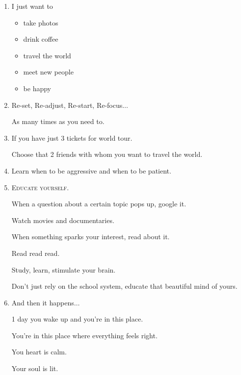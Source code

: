 \documentclass{article}
\numberwithin{equation}{section}
\begin{document}
\begin{enumerate}
    \textit{These moments will change you}.
    
    \textit{Let them make you \textsc{stronger, smarter}, and \textsc{kinder}.}
    
    \textit{But don't you go and become someone that you're not}.
    
    \textit{Cry}.
    
    \textit{Scream if you have to}.
    
    \textit{Then you straighten out that crown and keep moving}.'' - Erin van Vuren
    \item I just want to
    \begin{itemize}
        \item take photos
        \item drink coffee
        \item travel the world
        \item meet new people
        \item be happy
    \end{itemize}
    \item Re-set, Re-adjust, Re-start, Re-focus$\ldots$
    
    As many times as you need to.
    \item If you have just 3 tickets for world tour.
    
    Choose that 2 friends with whom you want to travel the world.
    \item Learn when to be aggressive and when to be patient.
    \item \textsc{Educate yourself}.
    
    When a question about a certain topic pops up, google it.
    
    Watch movies and documentaries.
    
    When something sparks your interest, read about it.
    
    Read read read.
    
    Study, learn, stimulate your brain.
    
    Don't just rely on the school system, educate that beautiful mind of yours.
    \item And then it happens$\ldots$
    
    1 day you wake up and you're in this place.
    
    You're in this place where everything feels right.
    
    You heart is calm.
    
    Your soul is lit.
    

\end{enumerate}
\end{document}
